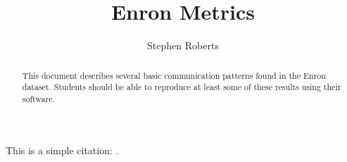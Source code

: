 \documentclass[a4paper]{article}
\title{Enron Metrics}
\author{Stephen Roberts}
\begin{document}
\maketitle
\begin{abstract}
  This document describes several basic communication patterns found in the Enron dataset.
  Students should be able to reproduce at least some of these results using their software.
\end{abstract}

This is a simple citation: \cite{mclean:2005aa}.



\end{document}
